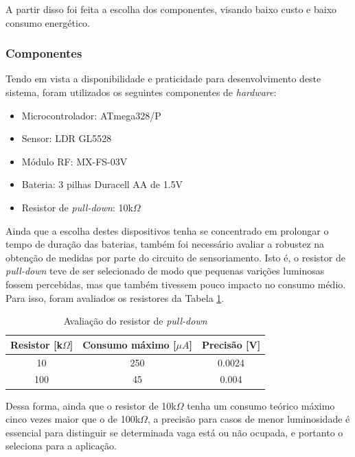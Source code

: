\documentclass[oneside,openright,12pt]{ufsm_2015} %
\begin{document}
    A partir disso foi feita a escolha dos componentes, visando baixo custo e baixo consumo energético.
    
    \subsubsection{Componentes}
    Tendo em vista a disponibilidade e praticidade para desenvolvimento deste sistema, foram utilizados os seguintes componentes de \textit{hardware}:
    \begin{itemize}
        \item Microcontrolador: ATmega328/P
        \item Sensor: LDR GL5528 
        \item Módulo RF: MX-FS-03V
        \item Bateria: 3 pilhas Duracell AA de 1.5V
        \item Resistor de \textit{pull-down}: 10k$\Omega$
    \end{itemize}
    
    Ainda que a escolha destes dispositivos tenha se concentrado em prolongar o tempo de duração das baterias, também foi necessário avaliar a robustez na obtenção de medidas por parte do circuito de sensoriamento. Isto é, o resistor de \textit{pull-down} teve de ser selecionado de modo que pequenas varições luminosas fossem percebidas, mas que também tivessem pouco impacto no consumo médio. Para isso, foram avaliados os resistores da Tabela \ref{table:pull-down}.
    
    \begin{table}[ht]
         \centering
         \caption{Avaliação do resistor de \textit{pull-down}}
         \begin{tabular}{ c c c }
             \hline
             Resistor [k$\Omega$] & Consumo máximo [$\mu A$] & Precisão [V] \\
             \hline
             10 & 250 & 0.0024 \\
             100 & 45 & 0.004 \\
             \hline
         \end{tabular}
         \vspace{\baselineskip} %
          \label{table:pull-down}
    \end{table}
    
    Dessa forma, ainda que o resistor de 10k$\Omega$ tenha um consumo teórico máximo cinco vezes maior que o de 100k$\Omega$, a precisão para casos de menor luminosidade é essencial para distinguir se determinada vaga está ou não ocupada, e portanto o seleciona para a aplicação.
    
\end{document}

